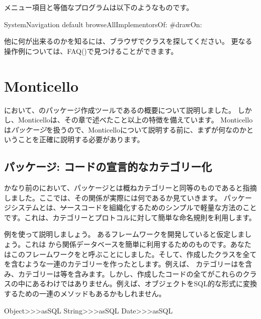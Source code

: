 \documentclass[a4paper,10pt,twoside]{book}
\begin{document}
メニュー項目と等価なプログラムは以下のようなものです。
\begin{code}{}
SystemNavigation default browseAllImplementorsOf: #drawOn:
\end{code}

他に何が出来るのかを知るには、ブラウザでクラスを探してください。
更なる操作例については、FAQ()で見つけることができます。

\section{Monticello}

において、\pharo のパッケージ作成ツールであるの概要について説明しました。
しかし、Monticelloは、その章で述べたこと以上の特徴を備えています。
Monticelloは\emph{パッケージ}を扱うので、Monticelloについて説明する前に、まずが何なのかということを正確に説明する必要があります。

\subsection{パッケージ: \pharo コードの宣言的なカテゴリー化}

かなり前のにおいて、パッケージとは概ねカテゴリーと同等のものであると指摘しました。ここでは、その関係が実際には何であるか見ていきます。
パッケージシステムとは、\st ソースコードを組織化するためのシンプルで軽量な方法のことです。これは、カテゴリーとプロトコルに対して簡単な命名規則を利用します。

例を使って説明しましょう。
あるフレームワークを開発していると仮定しましょう。これは \pharo から関係データベースを簡単に利用するためのものです。あなたはこのフレームワークをと呼ぶことにしました。そして、作成したクラスを全てを含むような一連のカテゴリーを作ったとします。例えば、
カテゴリーはを含み、カテゴリーは等を含みます。しかし、作成したコードの全てがこれらのクラスの中にあるわけではありません。例えば、オブジェクトをSQL的な形式に変換するための一連のメソッドもあるかもしれません。

\begin{code}{}
Object>>>asSQL
String>>>asSQL
Date>>>asSQL
\end{code}
\end{document}
